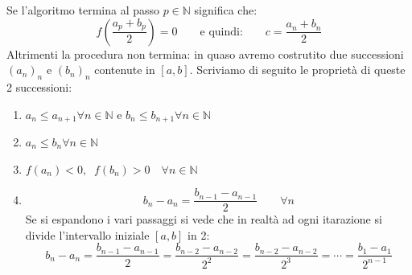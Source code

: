 {\begin{enumerate}
  \end{enumerate}

  Se l'algoritmo termina al passo $p \in \mathbb{N}$ significa che:
  \begin{equation*}
    f\left(\dfrac{a_p + b_p}{2}\right) = 0 \qquad \text{e quindi:} \qquad c = \dfrac{a_n + b_n}{2}
  \end{equation*}
  Altrimenti la procedura non termina: in quaso avremo costrutito due successioni $(a_n)_n$ e $(b_n)_n$ contenute in $[a, b]$. Scriviamo di seguito le proprietà di queste 2 successioni:
  \begin{enumerate}[label=\roman*.]
    \item $a_n \leq a_{n+1} \forall n \in \mathbb{N}$ \quad e \quad $b_n \leq b_{n+1} \forall n \in \mathbb{N}$

    \item $a_n \leq b_n \forall n \in \mathbb{N}$ 
      
    \item $f(a_n) < 0, \;\; f(b_n) > 0 \quad \forall n \in \mathbb{N}$
    
    \item 
      \begin{equation*}
        b_n - a_n = \dfrac{b_{n-1} - a_{n-1}}{2} \qquad \forall n
      \end{equation*}
      Se si espandono i vari passaggi si vede che in realtà ad ogni itarazione si divide l'intervallo iniziale $[a, b]$ in 2:
      \begin{equation*}
        b_n - a_n = \dfrac{b_{n-1} - a_{n-1}}{2} = \dfrac{b_{n-2} - a_{n-2}}{2^2} = \dfrac{b_{n-2} - a_{n-2}}{2^3}  = \cdots = \dfrac{b_1 - a_1}{2^{n-1}}
      \end{equation*}
  \end{enumerate}

}
